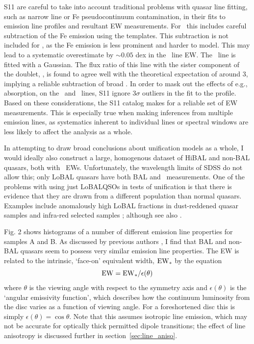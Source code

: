 S11 are careful to take into account traditional problems with quasar line fitting,
such as narrow line or Fe pseudocontinuum contamination, in their fits to 
emission line profiles and resultant EW measurements. For \mgline\
this includes careful subtraction of the Fe emission using the \cite{vestergaard2001}
templates. This subtraction is not included for \civfull,
as the Fe emission is less prominent and harder to model. This may lead to
a systematic overestimate by $\sim0.05$ dex in the \civ\ line EW. 
The \oiiifull\ line is fitted with a Gaussian. The flux ratio of this line 
with the sister component of the doublet, \oiiidoublet, is found to agree well 
with the theoretical expectation of around 3, implying a reliable subtraction of broad \hb.
In order to mask out the effects of e.g., absorption, on the \civ\ and \mg\ lines, 
S11 ignore $3\sigma$ outliers in the fit to the profile. Based on these
considerations, the S11 catalog makes for a reliable set of EW 
measurements. This is especially true when making inferences from 
multiple emission lines, as systematics inherent to individual lines 
or spectral windows are less likely to affect the analysis as a whole.

In attempting to draw broad conclusions about unification models as a whole,
I would ideally also construct a large, homogenous dataset of 
HiBAL and non-BAL quasars, both with \oiiifull\ EWs. Unfortunately,
the wavelength limits of SDSS do not allow this; only LoBAL quasars have 
both BAL and \ewo\ measurements. One of the problems with
using just LoBALQSOs in tests of unification is that there is evidence 
that they are drawn from a different population than normal quasars. 
Examples include anomalously 
high LoBAL fractions in dust-reddened quasar samples \citep{urrutia2009} 
and infra-red selected samples \citep{dai2012}; 
although see also \cite{lazarova2012}.

Fig. 2 shows histograms of a number of different 
emission line properties for samples A and B. 
As discussed by previous authors \cite[e.g.][]{weymann1991}, I find that BAL
and non-BAL quasars seem to possess very similar emission line 
properties. The EW is related to the intrinsic, `face-on' equivalent width,
${\rm EW}_*$ by the equation
\begin{equation}
{\rm EW} = {\rm EW}_* /\epsilon(\theta)
\end{equation}
where $\theta$ is the viewing angle with respect to the symmetry axis 
and $\epsilon(\theta)$ is the `angular emissivity function', which describes 
how the continuum luminosity from the disc varies as a function of viewing angle.
For a foreshortened disc this is simply $\epsilon(\theta) = \cos \theta$. 
Note that this assumes isotropic line emission, which may not be accurate for optically thick
permitted dipole transitions; the effect of line anisotropy is discussed further 
in section~\ref{sec:line_aniso}.

